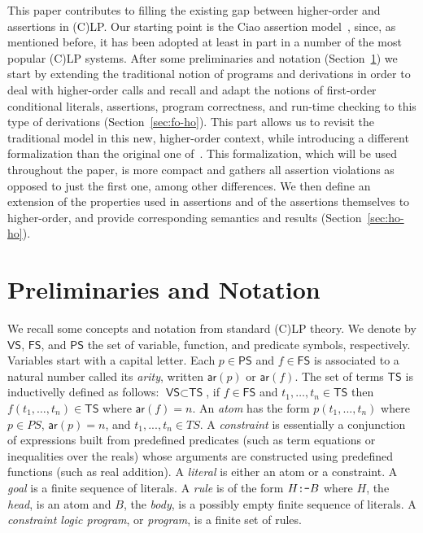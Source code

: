 \documentclass{llncs}
\newcommand{\VS}{\textsf{VS}}
\newcommand{\FS}{\textsf{FS}}
\newcommand{\PS}{\textsf{PS}}
\newcommand{\TS}{\textsf{TS}}
\newcommand{\ar}[1]{\ensuremath{\textsf{ar}(#1)}}
\begin{document}
This paper contributes to filling the existing gap between
higher-order and assertions in (C)LP.
Our starting point is the Ciao assertion
model~\cite{assrt-theoret-framework-lopstr99,ciaopp-sas03-journal-scp-short}, since, as mentioned before, it has
been adopted at least in part in a number of the most popular (C)LP
systems.
After some preliminaries and notation (Section~\ref{sec:Prel-Notat})
we start by extending the traditional notion of programs and
derivations in order to deal with higher-order calls and recall and
adapt the notions of first-order conditional literals, assertions,
program correctness, and run-time checking to this type of
derivations (Section~\ref{sec:fo-ho}). This part allows us to revisit
the traditional model in this new, higher-order context, while
introducing a different formalization than the original one
of~\cite{assrt-theoret-framework-lopstr99}. This formalization, which
will be used throughout the paper, is more compact and gathers all
assertion violations as opposed to just the first one, among other
differences.
We then define an extension of the properties used in assertions and
of the assertions themselves to higher-order, and provide
corresponding semantics and results (Section~\ref{sec:ho-ho}).




\section{Preliminaries and Notation}
\label{sec:Prel-Notat}

We recall some concepts and notation from standard (C)LP theory.
We denote by $\VS$, $\FS$, and $\PS$ the set of variable, function,
and predicate symbols, respectively. Variables start with a capital
letter. Each $p \in \PS$ and $f \in \FS$ is associated to a natural
number called its \emph{arity}, written $\ar{p}$ or $\ar{f}$.
The set of terms $\TS$ is inductivelly defined as follows: 
$\VS \subset \TS$, if $f \in \FS$ and $t_1, \ldots, t_n \in \TS$
then $f(t_1,\ldots,t_n) \in \TS$ where $\ar{f}=n$.
An \emph{atom} has the form $p(t_1,...,t_n)$ where 
$p \in PS$, $\ar{p} = n$, and $t_1,...,t_n \in TS$. 
A \emph{constraint} is essentially a conjunction of expressions built
from predefined predicates (such as term equations or inequalities
over the reals) whose arguments are constructed using predefined
functions (such as real addition).
A \emph{literal} is either an atom or a constraint. 
A \emph{goal} is a finite sequence of literals.
A \emph{rule} is of the form $H \mbox{\tt :-} B$ where $H$, the
\emph{head}, is an atom and $B$, the \emph{body}, is a possibly empty
finite sequence of literals.
A \emph{constraint logic program}, or \emph{program}, is a finite set
of rules.
\end{document}
